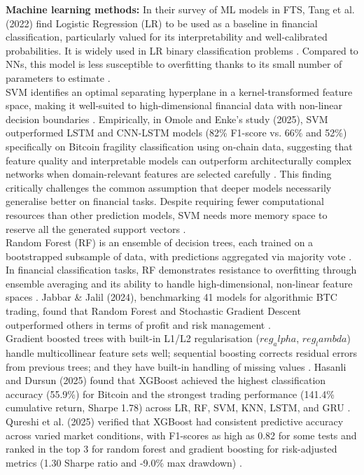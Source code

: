 \noindent \textbf{Machine learning methods:} In their survey of ML models in FTS, Tang et al. (2022) find Logistic Regression (LR) to be used as a baseline in financial classification, particularly valued for its interpretability and well-calibrated probabilities. It is widely used in LR binary classification problems \cite{kalinicmilicevicWhatFactorsInfluence2023}. Compared to NNs, this model is less susceptible to overfitting thanks to its small number of parameters to estimate \cite{akyildirimPredictionCryptocurrencyReturns2021}.\\
SVM identifies an optimal separating hyperplane in a kernel-transformed feature space, making it well-suited to high-dimensional financial data with non-linear decision boundaries \cite{renForecastingStockMarket2019}. Empirically, in Omole and Enke’s study (2025), SVM outperformed LSTM and CNN-LSTM models (82\% F1-score vs. 66\% and 52\%) specifically on Bitcoin fragility classification using on-chain data, suggesting that feature quality and interpretable models can outperform architecturally complex networks when domain-relevant features are selected carefully \cite{omoleUsingMachineDeep2025}. This finding critically challenges the common assumption that deeper models necessarily generalise better on financial tasks. Despite requiring fewer computational resources than other prediction models, SVM needs more memory space to reserve all the generated support vectors \cite{tangSurveyMachineLearning2022}.\\
Random Forest (RF) is an ensemble of decision trees, each trained on a bootstrapped subsample of data, with predictions aggregated via majority vote \cite{breimanRandomForests2001}. In financial classification tasks, RF demonstrates resistance to overfitting through ensemble averaging and its ability to handle high-dimensional, non-linear feature spaces \cite{tangSurveyMachineLearning2022}. Jabbar \& Jalil (2024), benchmarking 41 models for algorithmic BTC trading, found that Random Forest and Stochastic Gradient Descent outperformed others in terms of profit and risk management \cite{jabbarComprehensiveAnalysisMachine2024}.\\
Gradient boosted trees with built-in L1/L2 regularisation ($reg_alpha$, $reg_lambda$) handle multicollinear feature sets well; sequential boosting corrects residual errors from previous trees; and they have built-in handling of missing values \cite{chenXGBoostScalableTree2016, hasanliIntegratingHighDimensionalTechnical2025, samsonDevelopmentBitcoinClosing2025}. Hasanli and Dursun (2025) found that XGBoost achieved the highest classification accuracy (55.9\%) for Bitcoin and the strongest trading performance (141.4\% cumulative return, Sharpe 1.78) across LR, RF, SVM, KNN, LSTM, and GRU \cite{hasanliIntegratingHighDimensionalTechnical2025}. Qureshi et al. (2025) verified that XGBoost had consistent predictive accuracy across varied market conditions, with F1-scores as high as 0.82 for some tests and ranked in the top 3 for random forest and gradient boosting for risk-adjusted metrics (1.30 Sharpe ratio and -9.0\% max drawdown) \cite{qureshiEvaluatingMachineLearning2025}.


